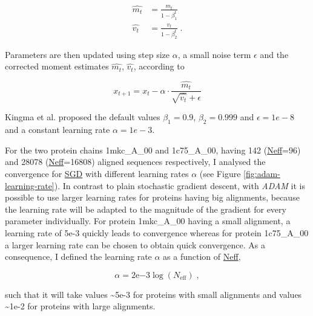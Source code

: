 \documentclass[11pt,a4paper,twoside]{book}
\theoremstyle{definition}
\theoremstyle{definition}
\theoremstyle{remark}
\begin{document}
\begin{align}
  \hat{m_t} &= \frac{m_t}{1-\beta_1^t} \\
  \hat{v_t} &= \frac{v_t}{1-\beta_2^t} \; .
\end{align}

Parameters are then updated using step size \(\alpha\), a small noise
term \(\epsilon\) and the corrected moment estimates \(\hat{m_t}\),
\(\hat{v_t}\), according to

\begin{equation}
  x_{t+1} = x_t - \alpha \cdot \frac{\hat{m_t}}{\sqrt{\hat{v_t}} + \epsilon}
\end{equation}

Kingma et al. proposed the default values \(\beta_1=0.9\),
\(\beta_2=0.999\) and \(\epsilon=1e−8\) and a constant learning rate
\(\alpha=1e-3\).

For the two protein chains 1mkc\_A\_00 and 1c75\_A\_00, having 142
(\protect\hyperlink{abbrev}{Neff}=96) and 28078
(\protect\hyperlink{abbrev}{Neff}=16808) aligned sequences respectively,
I analysed the convergence for \protect\hyperlink{abbrev}{SGD} with
different learning rates \(\alpha\) (see Figure
\ref{fig:adam-learning-rate}). In contrast to plain stochastic gradient
descent, with \emph{ADAM} it is possible to use larger learning rates
for proteins having big alignments, because the learning rate will be
adapted to the magnitude of the gradient for every parameter
individually. For protein 1mkc\_A\_00 having a small alignment, a
learning rate of 5e-3 quickly leads to convergence whereas for protein
1c75\_A\_00 a larger learning rate can be chosen to obtain quick
convergence. As a consequence, I defined the learning rate \(\alpha\) as
a function of \protect\hyperlink{abbrev}{Neff},

\begin{equation}
  \alpha = 2\mathrm{e}{-3}\log(N_{\text{eff}}) \; ,
  \label{eq:learning-rate-wrt-neff-adam}
\end{equation}

such that it will take values \textasciitilde{}5e-3 for proteins with
small alignments and values \textasciitilde{}1e-2 for proteins with
large alignments.
\end{document}

